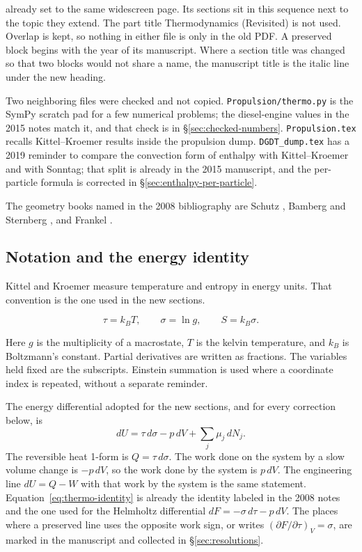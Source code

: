 already set to the same widescreen page. Its sections sit in this sequence next to the topic they extend. The part title Thermodynamics (Revisited) is not used. Overlap is kept, so nothing in either file is only in the old PDF. A preserved block begins with the year of its manuscript. Where a section title was changed so that two blocks would not share a name, the manuscript title is the italic line under the new heading.

Two neighboring files were checked and not copied. \texttt{Propulsion/thermo.py} is the SymPy scratch pad for a few numerical problems; the diesel-engine values in the 2015 notes match it, and that check is in \S\ref{sec:checked-numbers}. \texttt{Propulsion.tex} recalls Kittel--Kroemer results inside the propulsion dump. \texttt{DGDT\_dump.tex} has a 2019 reminder to compare the convection form of enthalpy with Kittel--Kroemer and with Sonntag; that split is already in the 2015 manuscript, and the per-particle formula is corrected in \S\ref{sec:enthalpy-per-particle}.

The geometry books named in the 2008 bibliography are Schutz \cite{BSchutz1980}, Bamberg and Sternberg \cite{PBambergSSternberg1990}, and Frankel \cite{TFrankel2004}.

\subsection{Notation and the energy identity}

Kittel and Kroemer measure temperature and entropy in energy units. That convention is the one used in the new sections.

\begin{equation}
\label{eq:tau-sigma}
\tau = k_B T,
\qquad
\sigma = \ln g,
\qquad
S = k_B \sigma.
\end{equation}

Here \(g\) is the multiplicity of a macrostate, \(T\) is the kelvin temperature, and \(k_B\) is Boltzmann's constant. Partial derivatives are written as fractions. The variables held fixed are the subscripts. Einstein summation is used where a coordinate index is repeated, without a separate reminder.

The energy differential adopted for the new sections, and for every correction below, is
\begin{equation}
\label{eq:thermo-identity}
dU = \tau\, d\sigma - p\, dV + \sum_j \mu_j\, dN_j.
\end{equation}
The reversible heat 1-form is \(Q = \tau\, d\sigma\). The work done on the system by a slow volume change is \(-p\, dV\), so the work done by the system is \(p\, dV\). The engineering line \(dU = Q - W\) with that work by the system is the same statement. Equation~\eqref{eq:thermo-identity} is already the identity labeled in the 2008 notes and the one used for the Helmholtz differential \(dF = -\sigma\, d\tau - p\, dV\). The places where a preserved line uses the opposite work sign, or writes \((\partial F/\partial \tau)_V = \sigma\), are marked in the manuscript and collected in \S\ref{sec:resolutions}.

